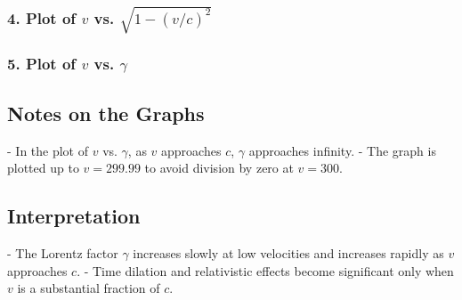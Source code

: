 \documentclass{article}
\begin{document}
\begin{multicols}{2}
\columnbreak

\subsubsection*{4. Plot of $v$ vs. $\sqrt{1 - (v/c)^2}$}


\subsubsection*{5. Plot of $v$ vs. $\gamma$}


\subsection*{Notes on the Graphs}

- In the plot of \( v \) vs. \( \gamma \), as \( v \) approaches \( c \), \( \gamma \) approaches infinity.
- The graph is plotted up to \( v = 299.99 \) to avoid division by zero at \( v = 300 \).

\subsection*{Interpretation}

- The Lorentz factor \( \gamma \) increases slowly at low velocities and increases rapidly as \( v \) approaches \( c \).
- Time dilation and relativistic effects become significant only when \( v \) is a substantial fraction of \( c \).

\end{multicols}
\end{document}
